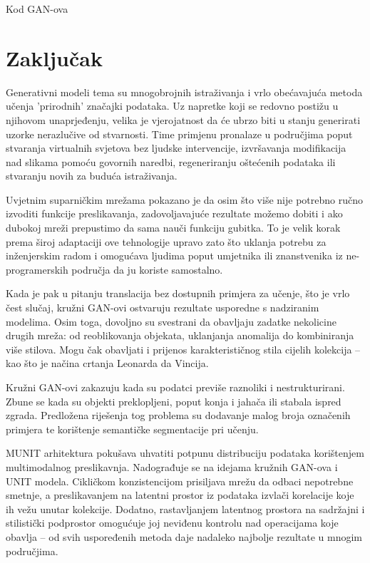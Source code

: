 \documentclass[lmodern, utf8, seminar]{fer}
\begin{document}
Kod GAN-ova




\chapter{Zaključak}
Generativni modeli tema su mnogobrojnih istraživanja i vrlo obećavajuća metoda učenja 'prirodnih' značajki podataka. Uz napretke koji se redovno postižu u njihovom unaprjeđenju, velika je vjerojatnost da će ubrzo biti u stanju generirati uzorke nerazlučive od stvarnosti. Time primjenu pronalaze u područjima poput stvaranja virtualnih svjetova bez ljudske intervencije, izvršavanja modifikacija nad slikama pomoću govornih naredbi, regeneriranju oštećenih podataka ili stvaranju novih za buduća istraživanja.
\newline

Uvjetnim suparničkim mrežama pokazano je da osim što više nije potrebno ručno izvoditi funkcije preslikavanja, zadovoljavajuće rezultate možemo dobiti i ako dubokoj mreži prepustimo da sama nauči funkciju gubitka. To je velik korak prema široj adaptaciji ove tehnologije upravo zato što uklanja potrebu za inženjerskim radom i omogućava ljudima poput umjetnika ili znanstvenika iz ne-programerskih područja da ju koriste samostalno.
\newline

Kada je pak u pitanju translacija bez dostupnih primjera za učenje, što je vrlo čest slučaj, kružni GAN-ovi ostvaruju rezultate usporedne s nadziranim modelima. Osim toga, dovoljno su svestrani da obavljaju zadatke nekolicine drugih mreža: od reoblikovanja objekata, uklanjanja anomalija do kombiniranja više stilova. Mogu čak obavljati i prijenos karakterističnog stila cijelih kolekcija -- kao što je načina crtanja Leonarda da Vincija. 

Kružni GAN-ovi zakazuju kada su podatci previše raznoliki i nestrukturirani. Zbune se kada su objekti preklopljeni, poput konja i jahača ili stabala ispred zgrada. Predložena riješenja tog problema su dodavanje malog broja označenih primjera te korištenje semantičke segmentacije pri učenju. 


\newpage
MUNIT arhitektura pokušava uhvatiti potpunu distribuciju podataka korištenjem multimodalnog preslikavnja. Nadograđuje se na idejama kružnih GAN-ova i UNIT modela. Cikličkom konzistencijom prisiljava mrežu da odbaci nepotrebne smetnje, a preslikavanjem na latentni prostor iz podataka izvlači korelacije koje ih vežu unutar kolekcije. Dodatno, rastavljanjem latentnog prostora na sadržajni i stilistički podprostor omogućuje joj neviđenu kontrolu nad operacijama koje obavlja -- od svih uspoređenih metoda daje nadaleko najbolje rezultate u mnogim područjima.
\end{document}

